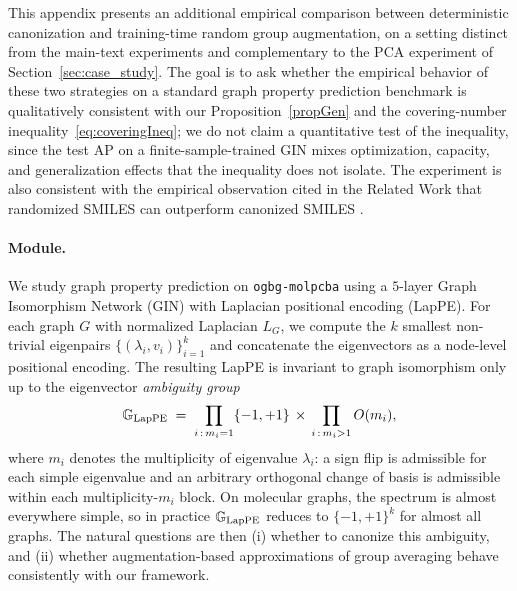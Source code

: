 \documentclass{article}
\begin{document}
This appendix presents an additional empirical comparison between deterministic
canonization and training-time random group augmentation, on a setting
distinct from the main-text experiments and complementary to the PCA
experiment of Section~\ref{sec:case_study}. The goal is to ask whether the empirical behavior of these two strategies on a standard graph property prediction benchmark is qualitatively consistent with our Proposition~\ref{propGen} and the covering-number inequality~\eqref{eq:coveringIneq}; we do not claim a quantitative test of the inequality, since the test AP on a finite-sample-trained GIN mixes optimization, capacity, and
generalization effects that the inequality does not isolate. The experiment is also consistent with the empirical observation cited in the Related Work that randomized SMILES can outperform canonized SMILES \cite{ArusPous2019,Bjerrum2017SMILESEA}.

\paragraph{Module.}
We study graph property prediction on \texttt{ogbg-molpcba} using a
$5$-layer Graph Isomorphism Network (GIN) with Laplacian positional
encoding (LapPE). For each graph $G$ with normalized Laplacian
$L_G$, we compute the $k$ smallest non-trivial eigenpairs
$\{(\lambda_i, v_i)\}_{i=1}^{k}$ and concatenate the eigenvectors as a
node-level positional encoding. The resulting LapPE is invariant to
graph isomorphism only up to the eigenvector \emph{ambiguity group}
\[
  \mathbb{G}_{\mathrm{LapPE}} \;=\; \prod_{i\,:\,m_i=1}\{-1,+1\} \,\times\, \prod_{i\,:\,m_i>1} O(m_i),
\]
where $m_i$ denotes the multiplicity of eigenvalue $\lambda_i$: a sign
flip is admissible for each simple eigenvalue and an arbitrary orthogonal
change of basis is admissible within each multiplicity-$m_i$ block. On
molecular graphs, the spectrum is almost everywhere simple, so in
practice $\mathbb{G}_{\mathrm{LapPE}}$ reduces to $\{-1,+1\}^{k}$ for almost all
graphs. The natural questions are then (i) whether to canonize this
ambiguity, and (ii) whether augmentation-based approximations of group
averaging behave consistently with our framework.
\end{document}
